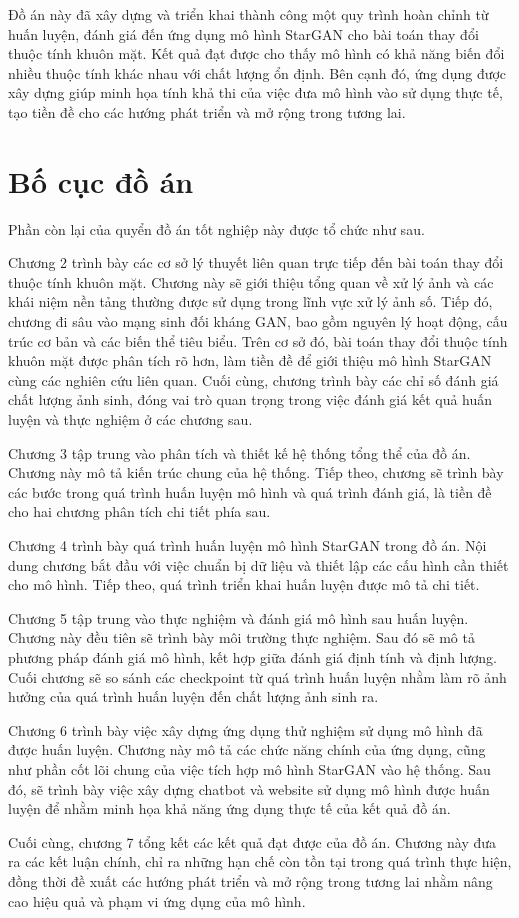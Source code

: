 \documentclass[../DoAn.tex]{subfiles}
\begin{document}
Đồ án này đã xây dựng và triển khai thành công một quy trình hoàn chỉnh từ huấn luyện, đánh giá đến ứng dụng mô hình StarGAN cho bài toán thay đổi thuộc tính khuôn mặt. Kết quả đạt được cho thấy mô hình có khả năng biến đổi nhiều thuộc tính khác nhau với chất lượng ổn định. Bên cạnh đó, ứng dụng được xây dựng giúp minh họa tính khả thi của việc đưa mô hình vào sử dụng thực tế, tạo tiền đề cho các hướng phát triển và mở rộng trong tương lai.

\section{Bố cục đồ án}
\label{section:1.4}
Phần còn lại của quyển đồ án tốt nghiệp này được tổ chức như sau.

Chương 2 trình bày các cơ sở lý thuyết liên quan trực tiếp đến bài toán thay đổi thuộc tính khuôn mặt. Chương này sẽ giới thiệu tổng quan về xử lý ảnh và các khái niệm nền tảng thường được sử dụng trong lĩnh vực xử lý ảnh số. Tiếp đó, chương đi sâu vào mạng sinh đối kháng GAN, bao gồm nguyên lý hoạt động, cấu trúc cơ bản và các biến thể tiêu biểu. Trên cơ sở đó, bài toán thay đổi thuộc tính khuôn mặt được phân tích rõ hơn, làm tiền đề để giới thiệu mô hình StarGAN cùng các nghiên cứu liên quan. Cuối cùng, chương trình bày các chỉ số đánh giá chất lượng ảnh sinh, đóng vai trò quan trọng trong việc đánh giá kết quả huấn luyện và thực nghiệm ở các chương sau.

Chương 3 tập trung vào phân tích và thiết kế hệ thống tổng thể của đồ án. Chương này mô tả kiến trúc chung của hệ thống. Tiếp theo, chương sẽ trình bày các bước trong quá trình huấn luyện mô hình và quá trình đánh giá, là tiền đề cho hai chương phân tích chi tiết phía sau.

Chương 4 trình bày quá trình huấn luyện mô hình StarGAN trong đồ án. Nội dung chương bắt đầu với việc chuẩn bị dữ liệu và thiết lập các cấu hình cần thiết cho mô hình. Tiếp theo, quá trình triển khai huấn luyện được mô tả chi tiết.

Chương 5 tập trung vào thực nghiệm và đánh giá mô hình sau huấn luyện. Chương này đều tiên sẽ trình bày môi trường thực nghiệm. Sau đó sẽ mô tả phương pháp đánh giá mô hình, kết hợp giữa đánh giá định tính và định lượng. Cuối chương sẽ so sánh các checkpoint từ quá trình huấn luyện nhằm làm rõ ảnh hưởng của quá trình huấn luyện đến chất lượng ảnh sinh ra.

Chương 6 trình bày việc xây dựng ứng dụng thử nghiệm sử dụng mô hình đã được huấn luyện. Chương này mô tả các chức năng chính của ứng dụng, cũng như phần cốt lõi chung của việc tích hợp mô hình StarGAN vào hệ thống. Sau đó, sẽ trình bày việc xây dựng chatbot và website sử dụng mô hình được huấn luyện để nhằm minh họa khả năng ứng dụng thực tế của kết quả đồ án.

Cuối cùng, chương 7 tổng kết các kết quả đạt được của đồ án. Chương này đưa ra các kết luận chính, chỉ ra những hạn chế còn tồn tại trong quá trình thực hiện, đồng thời đề xuất các hướng phát triển và mở rộng trong tương lai nhằm nâng cao hiệu quả và phạm vi ứng dụng của mô hình.
\end{document}
